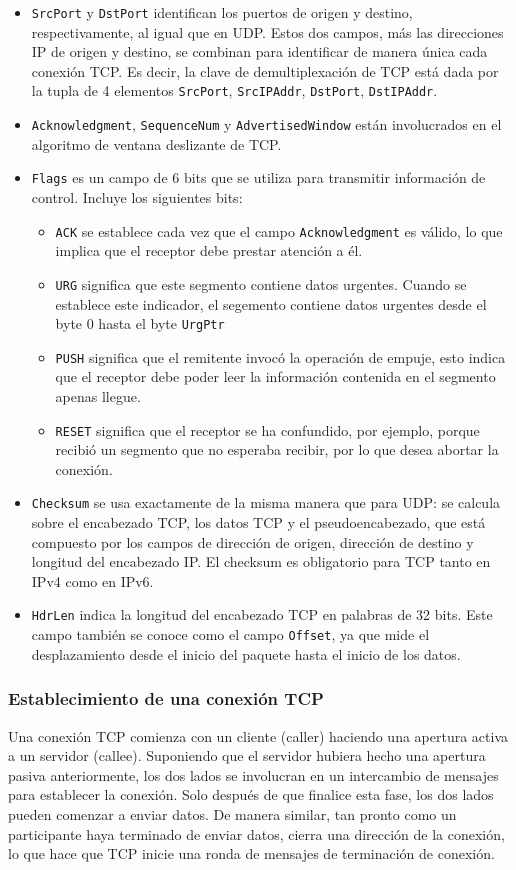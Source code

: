 \begin{itemize}
  \item \texttt{SrcPort} y \texttt{DstPort} identifican los puertos de origen y destino, respectivamente, al igual que en UDP. Estos dos campos, más las direcciones IP de origen y destino, se combinan para identificar de manera única cada conexión TCP. Es decir, la clave de demultiplexación de TCP está dada por la tupla de 4 elementos \texttt{SrcPort}, \texttt{SrcIPAddr}, \texttt{DstPort}, \texttt{DstIPAddr}.
  \item \texttt{Acknowledgment}, \texttt{SequenceNum} y \texttt{AdvertisedWindow} están involucrados en el algoritmo de ventana deslizante de TCP.
  \item \texttt{Flags} es un campo de 6 bits que se utiliza para transmitir información de control. Incluye los siguientes bits:
  \begin{itemize}
    \item \texttt{ACK} se establece cada vez que el campo \texttt{Acknowledgment} es válido, lo que implica que el receptor debe prestar atención a él. 
    \item\texttt{URG} significa que este segmento contiene datos urgentes. Cuando se establece este indicador, el segemento contiene datos urgentes desde el byte 0 hasta el byte \texttt{UrgPtr} 
    \item\texttt{PUSH} significa que el remitente invocó la operación de empuje, esto indica que el receptor debe poder leer la información contenida en el segmento apenas llegue.
    \item \texttt{RESET} significa que el receptor se ha confundido, por ejemplo, porque recibió un segmento que no esperaba recibir, por lo que desea abortar la conexión.
  \end{itemize}
  \item \texttt{Checksum} se usa exactamente de la misma manera que para UDP: se calcula sobre el encabezado TCP, los datos TCP y el pseudoencabezado, que está compuesto por los campos de dirección de origen, dirección de destino y longitud del encabezado IP. El checksum es obligatorio para TCP tanto en IPv4 como en IPv6. 
  \item \texttt{HdrLen} indica la longitud del encabezado TCP en palabras de 32 bits. Este campo también se conoce como el campo \texttt{Offset}, ya que mide el desplazamiento desde el inicio del paquete hasta el inicio de los datos.
\end{itemize}

\subsubsection{Establecimiento de una conexión TCP}
Una conexión TCP comienza con un cliente (caller) haciendo una apertura activa a un servidor (callee). Suponiendo que el servidor hubiera hecho una apertura pasiva anteriormente, los dos lados se involucran en un intercambio de mensajes para establecer la conexión. Solo después de que finalice esta fase, los dos lados pueden comenzar a enviar datos. De manera similar, tan pronto como un participante haya terminado de enviar datos, cierra una dirección de la conexión, lo que hace que TCP inicie una ronda de mensajes de terminación de conexión.

